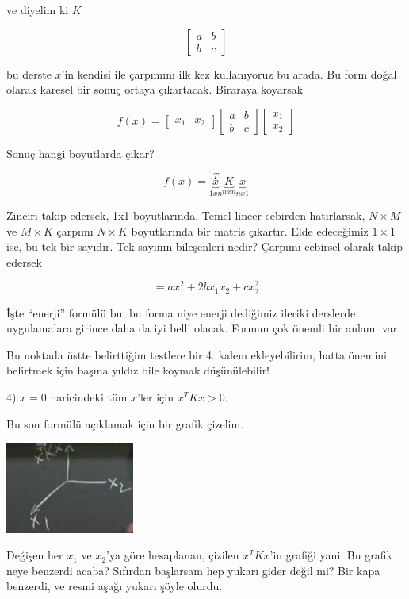 \documentclass[12pt,fleqn]{article}\usepackage{../../common}
\begin{document}
ve diyelim ki $K$

$$ 
\left[\begin{array}{rr}
a & b \\
b & c
\end{array}\right]
 $$

bu derste $x$'in kendisi ile çarpımını ilk kez kullanıyoruz bu arada. Bu
form doğal olarak karesel bir sonuç ortaya çıkartacak. Biraraya koyarsak

$$ f(x) =
\left[\begin{array}{rr}
x_1 & x_2 
\end{array}\right]
\left[\begin{array}{rr}
a & b \\
b & c
\end{array}\right]
\left[\begin{array}{r}
x_1 \\ x_2 
\end{array}\right]
 $$

Sonuç hangi boyutlarda çıkar?

$$ f(x) = \underbrace{x}_{1xn}^T\underbrace{K}_{nxn}\underbrace{x}_{nx1} $$

Zinciri takip edersek, 1x1 boyutlarında. Temel lineer cebirden hatırlarsak,
$N \times M$ ve $M \times K$ çarpımı $N \times K$ boyutlarında bir matris
çıkartır. Elde edeceğimiz $1 \times 1$ ise, bu tek bir sayıdır. Tek sayının
bileşenleri nedir? Çarpımı cebirsel olarak takip edersek

$$ = ax_1^2 + 2bx_1x_2 + cx_2^2 $$

İşte ``enerji'' formülü bu, bu forma niye enerji dediğimiz ileriki
derslerde uygulamalara girince daha da iyi belli olacak. Formun çok önemli
bir anlamı var. 

Bu noktada üstte belirttiğim testlere bir 4. kalem ekleyebilirim, hatta
önemini belirtmek için başına yıldız bile koymak düşünülebilir!

4) $x=0$ haricindeki tüm $x$'ler için $x^TKx > 0$.

Bu son formülü açıklamak için bir grafik çizelim. 

\includegraphics[height=3cm]{7_2.png}

Değişen her $x_1$ ve $x_2$'ya göre hesaplanan, çizilen $x^TKx$'in grafiği
yani. Bu grafik neye benzerdi acaba? Sıfırdan başlarsam hep yukarı gider
değil mi? Bir kapa benzerdi, ve resmi aşağı yukarı şöyle olurdu. 
\end{document}

